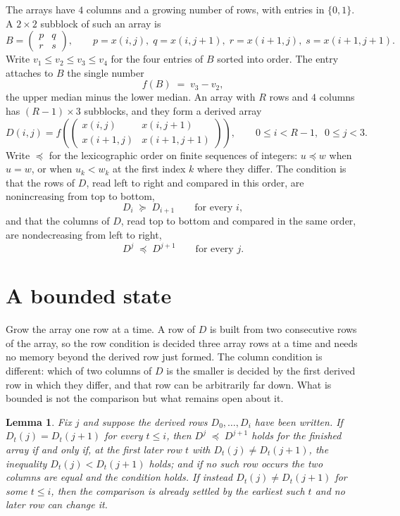 \documentclass[11pt,a4paper]{article}
\theoremstyle{plain}
\newtheorem{lemma}[theorem]{Lemma}
\theoremstyle{definition}
\begin{document}
The arrays have $4$ columns and a growing number of rows, with entries in $\{0,1\}$. A
$2\times2$ subblock of such an array is
\[
B=\begin{pmatrix} p & q \\ r & s \end{pmatrix},
\qquad p=x(i,j),\; q=x(i,j+1),\; r=x(i+1,j),\; s=x(i+1,j+1).
\]
Write $v_1\le v_2\le v_3\le v_4$ for the four entries of $B$ sorted into order. The entry attaches to $B$ the single number
\[
f(B)\;=\;v_3-v_2,
\]
the upper median minus the lower median. An array with $R$ rows and $4$ columns has $(R-1)\times3$ subblocks, and they
form a derived array
\[
D(i,j)=f\!\left(\begin{pmatrix} x(i,j) & x(i,j+1) \\ x(i+1,j) & x(i+1,j+1)\end{pmatrix}
\right),\qquad 0\le i<R-1,\;\; 0\le j<3 .
\]
Write $\preceq$ for the lexicographic order on finite sequences of integers: $u\preceq w$ when
$u=w$, or when $u_k<w_k$ at the first index $k$ where they differ. The condition is that the
rows of $D$, read left to right and compared in this order, are nonincreasing from top to bottom,
\[
D_{i}\;\succeq\;D_{i+1}\qquad\text{for every } i,
\]
and that the columns of $D$, read top to bottom and compared in the same order, are nondecreasing
from left to right,
\[
D^{j}\;\preceq\;D^{j+1}\qquad\text{for every } j .
\]

\section{A bounded state}

Grow the array one row at a time. A row of $D$ is built from two consecutive rows of the array,
so the row condition is decided three array rows at a time and needs no memory beyond the
derived row just formed. The column condition is different: which of two columns of $D$ is the
smaller is decided by the first derived row in which they differ, and that row can be
arbitrarily far down. What is bounded is not the comparison but what remains open about it.

\begin{lemma}\label{lem:bits}
Fix $j$ and suppose the derived rows $D_0,\dots,D_i$ have been written. If $D_t(j)=D_t(j+1)$ for
every $t\le i$, then $D^{j}\;\preceq\;D^{j+1}$ holds for the finished array if and only if,
at the first later row $t$ with $D_t(j)\neq D_t(j+1)$, the inequality $D_t(j)<D_t(j+1)$
holds; and if no such row occurs the two columns are equal and the condition holds. If instead
$D_t(j)\neq D_t(j+1)$ for some $t\le i$, then the comparison is already settled by the earliest
such $t$ and no later row can change it.
\end{lemma}
\end{document}

